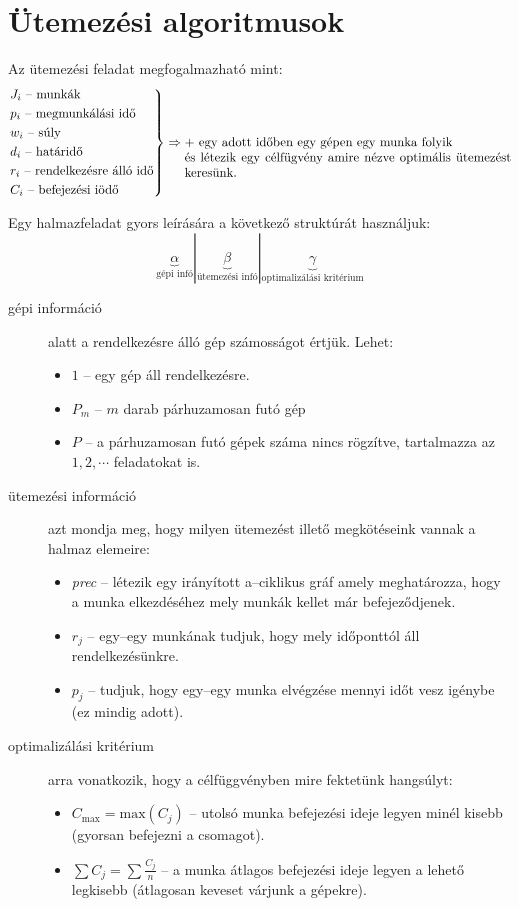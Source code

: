 \skiptooddpage 
\section{Ütemezési algoritmusok}

Az ütemezési feladat megfogalmazható mint:
\[
\begin{rcases}
J_i \mbox{ -- munkák} \\
p_i \mbox{ -- megmunkálási idő} \\
w_i \mbox{ -- súly} \\
d_i \mbox{ -- határidő} \\
r_i \mbox{ -- rendelkezésre álló idő} \\
C_i \mbox{ -- befejezési iödő} \\
\end{rcases}
\Rightarrow 
\parbox[t]{9cm}{ $+$ egy adott időben egy gépen egy munka folyik \\
és létezik egy célfügvény amire nézve optimális ütemezést keresünk.}
\]

Egy halmazfeladat gyors leírására a következő struktúrát használjuk:
\[
\underbrace{\alpha}_{\mbox{gépi infó}} | \underbrace{\beta}_{\mbox{ütemezési infó}
} | \underbrace{\gamma}_{\mbox{optimalizálási kritérium}}
\]

\begin{description}
  \item[gépi információ] alatt a rendelkezésre álló gép számosságot értjük. Lehet:
  \begin{itemize}
  \item $1$ -- egy gép áll rendelkezésre.
  \item $P_m$ -- $m$ darab párhuzamosan futó gép
  \item $P$ -- a párhuzamosan futó gépek száma nincs rögzítve, tartalmazza az $1,2,\cdots$ feladatokat is.
\end{itemize}
  \item[ütemezési információ] azt mondja meg, hogy milyen ütemezést illető
  megkötéseink vannak a halmaz elemeire:
  \begin{itemize}
  \item \emph{prec} -- létezik egy irányított a--ciklikus gráf amely
  meghatározza, hogy a munka elkezdéséhez mely munkák kellet már befejeződjenek.
  \item $r_j$ -- egy--egy munkának tudjuk, hogy mely időponttól áll rendelkezésünkre.
  \item $p_j$ -- tudjuk, hogy egy--egy munka elvégzése mennyi időt vesz igénybe
  (ez mindig adott).
\end{itemize}
  \item[optimalizálási kritérium] arra vonatkozik, hogy a célfüggvényben mire
  fektetünk hangsúlyt:
  \begin{itemize}
  \item $C_{\mbox{max}}=\mbox{max}(C_j)$ -- utolsó munka befejezési ideje legyen minél
  kisebb (gyorsan befejezni a csomagot).
  \item $\sum C_j = \sum \frac{C_j}{n}$ -- a munka átlagos befejezési ideje
  legyen a lehető legkisebb (átlagosan keveset várjunk a gépekre).
\end{itemize}
\end{description} 


